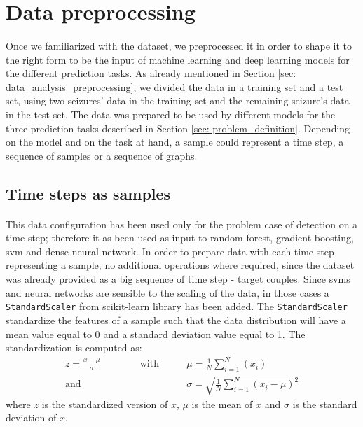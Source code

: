 \section{Data preprocessing} \label{sec: data_preprocessing}
\paragraph{} Once we familiarized with the dataset, we preprocessed it in order to shape it to the right form to be the input of machine learning and deep learning models for the different prediction tasks. As already mentioned in Section \ref{sec: data_analysis_preprocessing}, we divided the data in a training set and a test set, using two seizures' data in the training set and the remaining seizure's data in the test set. The data was prepared to be used by different models for the three prediction tasks described in Section \ref{sec: problem_definition}. Depending on the model and on the task at hand, a sample could represent a time step, a sequence of samples or a sequence of graphs.

\subsection{Time steps as samples}
\paragraph{} This data configuration has been used only for the problem case of detection on a time step; therefore it as been used as input to random forest, gradient boosting, \acs{svm} and dense neural network. In order to prepare data with each time step representing a sample, no additional operations where required, since the dataset was already provided as a big sequence of time step - target couples. Since \acsp{svm} and neural networks are sensible to the scaling of the data, in those cases a \texttt{StandardScaler} from scikit-learn library has been added. The \texttt{StandardScaler} standardize the features of a sample such that the data distribution will have a mean value equal to 0 and a standard deviation value equal to 1. The standardization is computed as:
\begin{align}
    z=\frac{x-\mu}{\sigma} \qquad\qquad \text{with}\qquad &\mu=\frac{1}{N} \sum_{i=1}^{N}\left(x_{i}\right)\\
                                        \text{and}\qquad &\sigma=\sqrt{\frac{1}{N} \sum_{i=1}^{N}\left(x_{i}-\mu\right)^{2}}
\end{align}
where $z$ is the standardized version of $x$, $\mu$ is the mean of $x$ and $\sigma$ is the standard deviation of $x$.

